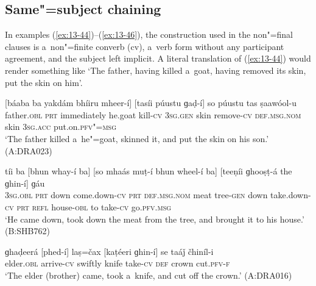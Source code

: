 \subsection{Same"=subject chaining}
\label{subsec:13-3-1}

In examples (\ref{ex:13-44})--(\ref{ex:13-46}), the construction used in the non"=final clauses is a~non"=finite converb (cv), a~verb form without any participant agreement, and the subject left implicit. A literal translation of (\ref{ex:13-44}) would render something like `The father, having killed a~goat, having removed its skin, put the skin on him'. 

\begin{exe}
\ex
\label{ex:13-44}
\gll \label{bkm:Ref190770484}[báaba ba yakdám bhíiru mheer-í] [tasíi púustu ɡaḍ-í] so púustu tas ṣaawóol-u  \\
father.\textsc{obl} \textsc{prt} immediately he.goat kill-\textsc{cv} \textsc{3sg.gen} skin  remove-\textsc{cv} \textsc{def.msg.nom} skin \textsc{3sg.acc} put.on.\textsc{pfv"=msg} \\
\glt `The father killed a~he"=goat, skinned it, and put the skin on his son.' (A:DRA023)

\ex
\label{ex:13-45}
\gll tíi ba [bhun whay-í ba] [so  mhaás muṭ-í bhun wheel-í ba] [teeṇíi
  ɡhooṣṭ-á the ɡhin-í] ɡáu \\
\textsc{3sg.obl} \textsc{prt} down come.down-\textsc{cv} \textsc{prt} \textsc{def.msg.nom}  meat tree-\textsc{gen} down take.down-\textsc{cv} \textsc{prt} \textsc{refl} house-\textsc{obl}  to take-\textsc{cv} go.\textsc{pfv.msg} \\
\glt `He came down, took down the meat from the tree, and brought it to his house.' (B:SHB762)

\ex
\label{ex:13-46}
\gll ɡhaḍeerá [phed-í] laṣ=čax [kaṭéeri ɡhin-í] se taáǰ čhiníl-i  \\
elder.\textsc{obl} arrive-\textsc{cv} swiftly knife take-\textsc{cv} \textsc{def} crown cut.\textsc{pfv-f} \\
\glt `The elder (brother) came, took a~knife, and cut off the crown.' (A:DRA016) 
\end{exe}

